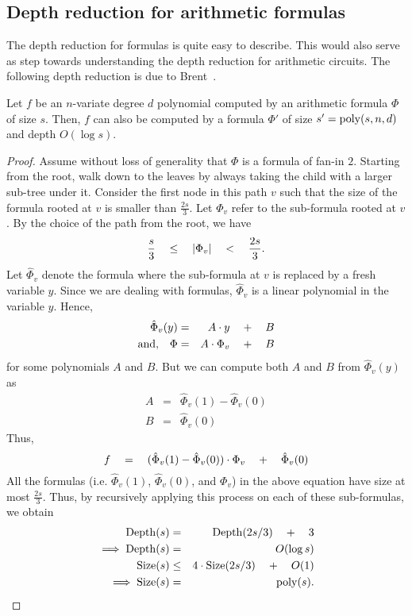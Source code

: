 \subsection{Depth reduction for arithmetic formulas}

The depth reduction for formulas is quite easy to describe. 
This would also serve as step towards understanding the depth reduction for arithmetic circuits. 
The following depth reduction is due to Brent~\cite{brent74}. 

\begin{lemma}\label{lem:formula-depth-reduction}
Let $f$ be an $n$-variate degree $d$ polynomial computed by an arithmetic formula $\Phi$ of size $s$. 
Then, $f$ can also be computed by a formula $\Phi'$ of size $s' = \operatorname{poly}(s,n,d)$ and depth $O(\log s)$. 
\end{lemma}
\begin{proof}
Assume without loss of generality that $\Phi$ is a formula of fan-in $2$. 
Starting from the root, walk down to the leaves by always taking the child with a larger sub-tree under it. 
Consider the first node in this path $v$ such that the size of the formula rooted at $v$ is smaller than $\frac{2s}{3}$. 
Let $\Phi_v$ refer to the sub-formula rooted at $v$. 
By the choice of the path from the root, we have
\[
\frac{s}{3} \quad \leq \quad \left|\Phi_v\right| \quad < \quad \frac{2s}{3}.
\]
Let $\hat{\Phi}_v$ denote the formula where the sub-formula at $v$ is replaced by a fresh variable $y$. 
Since we are dealing with formulas, $\hat{\Phi}_v$ is a linear polynomial in the variable $y$. 
Hence,
\begin{eqnarray*}
\hat{\Phi}_v(y) & = & A \cdot y \quad + \quad B\\
\text{and,}\quad \Phi & = & A \cdot \Phi_v \quad + \quad B
\end{eqnarray*}
for some polynomials $A$ and $B$. 
But we can compute both $A$ and $B$ from $\hat{\Phi}_v(y)$ as
\begin{eqnarray*}
A & = & \hat{\Phi}_v(1) - \hat{\Phi}_v(0)\\
B & = & \hat{\Phi}_v(0)
\end{eqnarray*}
Thus, 
\[
f \quad = \quad (\hat{\Phi}_v(1) - \hat{\Phi}_v(0))\cdot \Phi_v \quad + \quad \hat{\Phi}_v(0)
\]
All the formulas (i.e. $\hat{\Phi}_v(1)$, $\hat{\Phi}_v(0)$, and $\Phi_v$) in the above equation have size at most $\frac{2s}{3}$. 
Thus, by recursively applying this process on each of these sub-formulas, we obtain
\begin{eqnarray*}
\mathrm{Depth}(s) & = & \mathrm{Depth}(2s/3) \quad + \quad 3\\
\implies \mathrm{Depth}(s) &=& O(\log s)\\
\mathrm{Size}(s) & \leq & 4\cdot \mathrm{Size}(2s/3) \quad + \quad O(1)\\
\implies \mathrm{Size}(s) &=& \operatorname{poly}(s).
\end{eqnarray*}
\end{proof}


